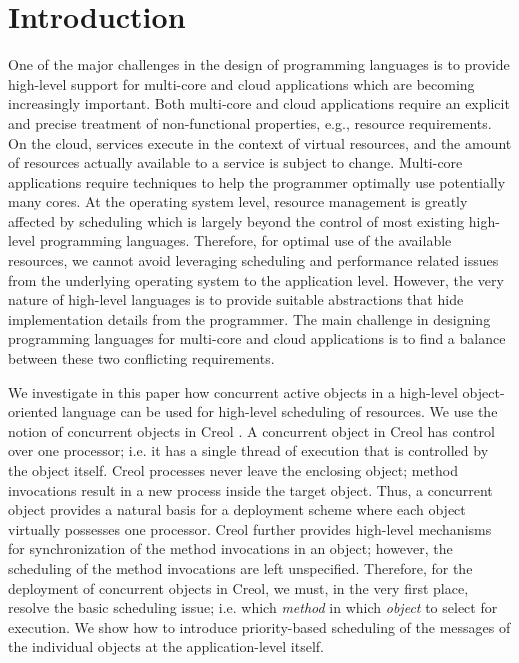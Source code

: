 \section{Introduction} \label{ch01:sec:introduction}
One of the major challenges in the design of programming
languages is to provide high-level support for  multi-core and cloud  applications which are becoming increasingly important.
Both multi-core and cloud  applications require an explicit and precise treatment of non-functional properties, e.g., resource requirements.
On the cloud, services execute in the
context of virtual resources, and the amount of resources actually available to a service is subject to change.
Multi-core applications require techniques 
to help the programmer optimally use potentially many cores. At
the operating system level, resource management is greatly affected by scheduling which
is largely beyond the control of most existing high-level programming languages.
Therefore, for optimal use of the available resources, we cannot avoid leveraging
scheduling and performance related issues from the underlying operating system
to the application level. However, the very nature of high-level languages is to
provide suitable abstractions that hide
implementation details from the programmer. The main challenge in designing programming languages
for  multi-core and cloud  applications
is to find a balance between these two conflicting requirements.

We investigate in this paper how concurrent active objects in a high-level object-oriented
language can be used for high-level scheduling of resources. We use the notion of
concurrent objects in Creol \cite{creol:broch_owe,mpd:andrews}. A
concurrent object in Creol has control over one processor; i.e. it has a
single thread of execution that is controlled by the object itself.
Creol processes never leave the enclosing object; method invocations
result in a new process inside the target object.  Thus, a concurrent
object provides a natural basis for a deployment scheme where each
object virtually possesses one processor. Creol further provides high-level
mechanisms for synchronization of the method invocations in an object;
however, the scheduling of the method invocations are left
unspecified. Therefore, for the deployment of concurrent objects in
Creol, we must, in the very first place, resolve the
basic scheduling issue; i.e. which \textit{method} in which
\textit{object} to select for execution.
We show how to introduce priority-based scheduling of the messages of the individual objects
at the application-level itself.


